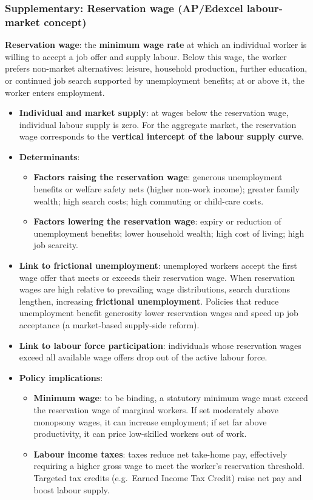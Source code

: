 \documentclass[a4paper,12pt]{article}
\newcommand{\needbold}[1]{\textcolor{red!70!black}{\textbf{#1}}}
\begin{document}
\subsubsection*{Supplementary: Reservation wage (AP/Edexcel labour-market concept)}
\needbold{Reservation wage}: the \textbf{minimum wage rate} at which an individual worker is willing to accept a job offer and supply labour. Below this wage, the worker prefers non-market alternatives: leisure, household production, further education, or continued job search supported by unemployment benefits; at or above it, the worker enters employment.
\begin{itemize}
  \item \textbf{Individual and market supply}: at wages below the reservation wage, individual labour supply is zero. For the aggregate market, the reservation wage corresponds to the \textbf{vertical intercept of the labour supply curve}.
  \item \textbf{Determinants}:
  \begin{itemize}
    \item \textbf{Factors raising the reservation wage}: generous unemployment benefits or welfare safety nets (higher non-work income); greater family wealth; high search costs; high commuting or child-care costs.
    \item \textbf{Factors lowering the reservation wage}: expiry or reduction of unemployment benefits; lower household wealth; high cost of living; high job scarcity.
  \end{itemize}
  \item \textbf{Link to frictional unemployment}: unemployed workers accept the first wage offer that meets or exceeds their reservation wage. When reservation wages are high relative to prevailing wage distributions, search durations lengthen, increasing \textbf{frictional unemployment}. Policies that reduce unemployment benefit generosity lower reservation wages and speed up job acceptance (a market-based supply-side reform).
  \item \textbf{Link to labour force participation}: individuals whose reservation wages exceed all available wage offers drop out of the active labour force.
  \item \textbf{Policy implications}:
  \begin{itemize}
    \item \textbf{Minimum wage}: to be binding, a statutory minimum wage must exceed the reservation wage of marginal workers. If set moderately above monopsony wages, it can increase employment; if set far above productivity, it can price low-skilled workers out of work.
    \item \textbf{Labour income taxes}: taxes reduce net take-home pay, effectively requiring a higher gross wage to meet the worker's reservation threshold. Targeted tax credits (e.g.\ Earned Income Tax Credit) raise net pay and boost labour supply.
  \end{itemize}
\end{itemize}
\end{document}
